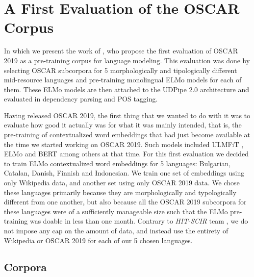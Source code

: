 \chapter{A First Evaluation of the OSCAR Corpus}
\label{chap:monolingual}

\begin{center}
    \begin{minipage}{0.66\textwidth}
        \begin{small}
            In which we present the work of \citet{ortiz-suarez-etal-2020-monolingual}, who propose the first evaluation of OSCAR 2019 as a pre-training corpus for language modeling. This evaluation was done by selecting OSCAR subcorpora for 5 morphologically and tipologically different mid-resource languages and pre-training monolingual ELMo models \citep{peters-etal-2018-deep} for each of them. These ELMo models are then attached to the UDPipe 2.0 architecture \citep{straka-2018-udpipe,straka-strakova-2019-evaluating} and evaluated in dependency parsing and POS tagging.
        \end{small}
    \end{minipage}
    \vspace{0.5cm}
\end{center}

Having released OSCAR 2019, the first thing that we wanted to do with it was to evaluate how good it actually was for what it was mainly intended, that is, the pre-training of contextualized word embeddings that had just become available at the time we started working on OSCAR 2019. Such models included ULMFiT \citep{howard-ruder-2018-universal}, ELMo \citep{peters-etal-2018-deep} and BERT \citep{devlin-etal-2019-bert} among others at that time. For this first evaluation we decided to train ELMo contextualized word embeddings for 5 languages: Bulgarian, Catalan, Danish, Finnish and Indonesian. We train one set of embeddings using only Wikipedia data, and another set using only OSCAR 2019 data. We chose these languages primarily because they are morphologically and typologically different from one another, but also because all the OSCAR 2019 subcorpora for these languages were of a sufficiently manageable size such that the ELMo pre-training was doable in less than one month. Contrary to \emph{HIT-SCIR} team \citep{che-etal-2018-towards}, we do not impose any cap on the amount of data, and instead use the entirety of Wikipedia or OSCAR 2019 for each of our 5 chosen languages.

\section{Corpora}

